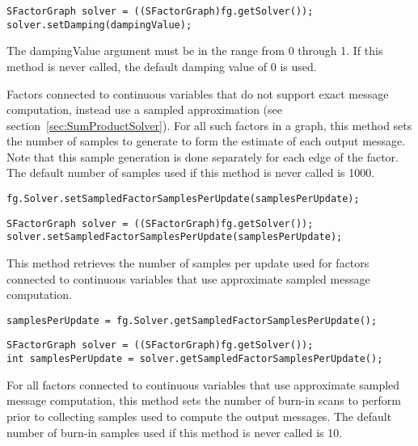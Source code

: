 \ifjava
\begin{lstlisting}
SFactorGraph solver = ((SFactorGraph)fg.getSolver());
solver.setDamping(dampingValue);
\end{lstlisting}
\fi

The dampingValue argument must be in the range from 0 through 1.  If this method is never called, the default damping value of 0 is used.


Factors connected to continuous variables that do not support exact message computation, instead use a sampled approximation (see section~\ref{sec:SumProductSolver}).  For all such factors in a graph, this method sets the number of samples to generate to form the estimate of each output message.  Note that this sample generation is done separately for each edge of the factor.  The default number of samples used if this method is never called is 1000.

\ifmatlab
\begin{lstlisting}
fg.Solver.setSampledFactorSamplesPerUpdate(samplesPerUpdate);
\end{lstlisting}
\fi

\ifjava
\begin{lstlisting}
SFactorGraph solver = ((SFactorGraph)fg.getSolver());
solver.setSampledFactorSamplesPerUpdate(samplesPerUpdate);
\end{lstlisting}
\fi



This method retrieves the number of samples per update used for factors connected to continuous variables that use approximate sampled message computation.

\ifmatlab
\begin{lstlisting}
samplesPerUpdate = fg.Solver.getSampledFactorSamplesPerUpdate();
\end{lstlisting}
\fi

\ifjava
\begin{lstlisting}
SFactorGraph solver = ((SFactorGraph)fg.getSolver());
int samplesPerUpdate = solver.getSampledFactorSamplesPerUpdate();
\end{lstlisting}
\fi



For all factors connected to continuous variables that use approximate sampled message computation, this method sets the number of burn-in scans to perform prior to collecting samples used to compute the output messages.  The default number of burn-in samples used if this method is never called is 10.

